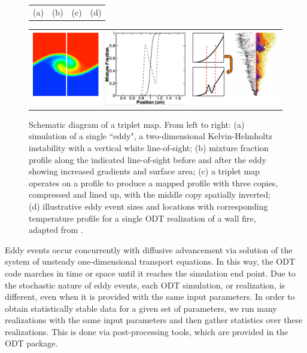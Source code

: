 \documentclass[preprint,12pt, a4paper]{elsarticle}
\begin{document}
\begin{figure}
		\begin{tabular}{llll}
			\hspace{40pt}(a) & \hspace{100pt} (b) & \hspace{70pt} (c) & \hspace{50pt}(d) 
		\end{tabular}
	\begin{center}
		\begin{tabular}{c}
			\includegraphics[width=\textwidth]{../figures/tripletmap/tripmap.pdf} 
		\end{tabular}
	\end{center}
    \caption{Schematic diagram of a triplet map. From left to right: (a) simulation of a single ``eddy", a two-dimensional Kelvin-Helmholtz instability with a vertical white line-of-sight; (b) mixture fraction profile along the indicated line-of-sight before and after the eddy showing increased gradients and surface area; (c) a triplet map operates on a profile to produce a mapped profile with three copies, compressed and lined up, with the middle copy spatially inverted; (d) illustrative eddy event sizes and locations with corresponding temperature profile for a single ODT realization of a wall fire, adapted from \cite{Monson_2016}.}
\label{fig:tripletmap}
\end{figure}

Eddy events occur concurrently with diffusive advancement via solution of the system of unsteady one-dimensional transport equations. In this way, the ODT code marches in time or space until it reaches the simulation end point. Due to the stochastic nature of eddy events, each ODT simulation, or realization, is different, even when it is provided with the same input parameters. In order to obtain statistically stable data for a given set of parameters, we run many realizations with the same input parameters and then gather statistics over these realizations. This is done via post-processing tools, which are provided in the ODT package. 

\end{document}
